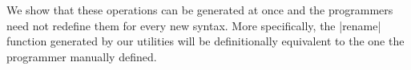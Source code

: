 \documentclass[sigplan,review,fleqn]{acmart}
\renewcommand{\verb}{\collectverb{\color{AgdaFunction}}}
\begin{document}
\begin{code}
	\>[20]\AgdaSymbol{=}\AgdaSpace{}%
	\AgdaSpace{}%
	\AgdaSymbol{(}\AgdaSpace{}%
	\AgdaSymbol{)}\<%
	\\
	\>[0]\AgdaSpace{}%
	\AgdaSpace{}%
	\AgdaSymbol{(}\AgdaSpace{}%
	\AgdaSpace{}%
	\AgdaSymbol{)}\AgdaSpace{}%
	\AgdaSymbol{=}\AgdaSpace{}%
	\AgdaSpace{}%
	\AgdaSymbol{(}\AgdaSpace{}%
	\AgdaSpace{}%
	\AgdaSymbol{)}\AgdaSpace{}%
	\AgdaSymbol{(}\AgdaSpace{}%
	\AgdaSpace{}%
	\AgdaSymbol{)}\<%
	\\
	\>[0]\AgdaSpace{}%
	\AgdaSpace{}%
	\AgdaSymbol{(}\AgdaSpace{}%
	\AgdaSymbol{)}%
	\>[20]\AgdaSymbol{=}\AgdaSpace{}%
	\AgdaSpace{}%
	\AgdaSymbol{(}\AgdaSpace{}%
	\AgdaSymbol{(}\AgdaSpace{}%
	\AgdaSymbol{)}\AgdaSpace{}%
	\AgdaSymbol{)}\<%
\end{code}
We show that these operations can be generated at once and the programmers need not redefine them for every new syntax.
More specifically, the \verb|rename| function generated by our utilities will be definitionally equivalent to the one the programmer manually defined.
\end{document}
